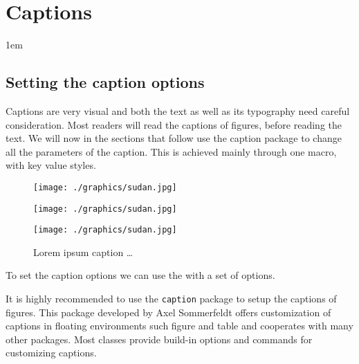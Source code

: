 \chapter{Captions}

\parindent1em

\section{Setting the caption options}

Captions are very visual and both the text as well as its typography need careful consideration. Most readers will read the captions of figures, before reading the text. We will now in the sections that follow use the caption package to change all the parameters of the caption. This is achieved mainly through one macro, with key value styles.


\def\acaption{Lorem ipsum caption \ldots}
\begin{figure*}[h]
\captionsetup{format=plain}
\captionsetup{skip=3pt}
\captionsetup{font=small}
\captionsetup{name=Fig}
\captionsetup[figure]{labelfont=bf,textfont=it}
\RaggedRight
\centering 
\begin{minipage}[t]{90pt}
 \texttt{[image: ./graphics/sudan.jpg]}
 \caption{\acaption }
 \label{fig:shortlabel}
\end{minipage}
\captionsetup{name=Figure}
\begin{minipage}[t]{90pt}
 \texttt{[image: ./graphics/sudan.jpg]}
 \caption{\acaption }
\end{minipage}
\captionsetup{name=Fig,labelsep=space}
\begin{minipage}[t]{90pt}
 \texttt{[image: ./graphics/sudan.jpg]}
 \caption{\acaption }
\end{minipage}
\end{figure*}


To set the caption options we can use the \cmd{\captionsetup} with a set of options.
\begin{dispListing}
\captionsetup{name=Fig, labelsep=space}
\end{dispListing}




It is highly recommended to use the \texttt{caption} package to setup the captions of figures. This package developed by Axel Sommerfeldt offers customization of captions in floating environments such
figure and table and cooperates with many other packages. Most classes provide build-in options and commands for customizing captions. 

